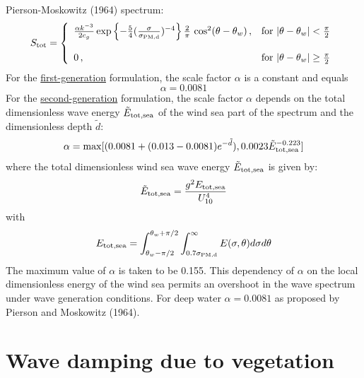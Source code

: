 \documentclass[12pt]{book}
\begin{document}
Pierson-Moskowitz (1964) spectrum:
\begin{equation}
   S_{\rm tot} =
    \left\{
      \begin{array}{ll}
         \frac{\alpha k^{-3}}{2c_g} \exp{ \left \{ -\frac{5}{4}(\frac{\sigma}{\sigma_{\rm PM,d}})^{-4} \right\} }
         \, \frac{2}{\pi} \, \cos^2(\theta-\theta_w)
         \, , & \mbox{for } |\theta - \theta_w| < \frac{\pi}{2} \\
         \\
         0 \, , & \mbox{for } |\theta - \theta_w| \geq \frac{\pi}{2} \\
      \end{array}
    \right.
\end{equation}
For the \underline{first-generation} formulation, the scale factor $\alpha$ is a constant and equals
\begin{equation}
  \alpha = 0.0081
\end{equation}
For the \underline{second-generation} formulation, the scale factor $\alpha$ depends on the total dimensionless
wave energy ${\tilde E}_{\rm tot,sea}$ of the wind sea part of the spectrum and the dimensionless depth ${\tilde d}$:
\begin{equation}
  \alpha = \max [ (0.0081 + (0.013 - 0.0081)e^{-{\tilde d}}), 0.0023 {\tilde E}^{-0.223}_{\rm tot,sea} ]
\end{equation}
where the total dimensionless wind sea wave energy ${\tilde E}_{\rm tot,sea}$ is given by:
\begin{equation}
  {\tilde E}_{\rm tot,sea} = \frac{g^2 E_{\rm tot,sea}}{U^4_{10}}
\end{equation}
with
\begin{equation}
  E_{\rm tot,sea} = \int_{\theta_w - \pi/2}^{\theta_w + \pi/2} \int_{0.7 \sigma_{\rm PM,d}}^{\infty}
  E(\sigma,\theta) d\sigma d\theta
\end{equation}
The maximum value of $\alpha$ is taken to be 0.155. This dependency of $\alpha$ on the local
dimensionless energy of the wind sea permits an overshoot in the wave spectrum under wave
generation conditions. For deep water $\alpha = 0.0081$ as proposed by Pierson and Moskowitz (1964).

\section{Wave damping due to vegetation} \label{sec:veget}
\end{document}
